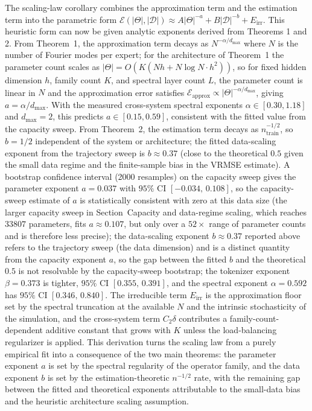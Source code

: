 \documentclass[preprint,12pt]{elsarticle}
\begin{document}
The scaling-law corollary combines the approximation term and the estimation term into the parametric form $\mathcal{E}(|\Theta|,|\mathcal{D}|)\approx A|\Theta|^{-a}+B|\mathcal{D}|^{-b}+E_{\mathrm{irr}}$. This heuristic form can now be given analytic exponents derived from Theorems 1 and 2. From Theorem~1, the approximation term decays as $N^{-\alpha/d_{\max}}$ where $N$ is the number of Fourier modes per expert; for the architecture of Theorem~1 the parameter count scales as $|\Theta|=O(K(Nh+N\log N\cdot h^2))$, so for fixed hidden dimension $h$, family count $K$, and spectral layer count $L$, the parameter count is linear in $N$ and the approximation error satisfies $\mathcal{E}_{\mathrm{approx}}\propto |\Theta|^{-\alpha/d_{\max}}$, giving $a=\alpha/d_{\max}$. With the measured cross-system spectral exponents $\alpha\in[0.30,1.18]$ and $d_{\max}=2$, this predicts $a\in[0.15,0.59]$, consistent with the fitted value from the capacity sweep. From Theorem~2, the estimation term decays as $n_{\mathrm{train}}^{-1/2}$, so $b=1/2$ independent of the system or architecture; the fitted data-scaling exponent from the trajectory sweep is $b\approx0.37$ (close to the theoretical $0.5$ given the small data regime and the finite-sample bias in the VRMSE estimate). A bootstrap confidence interval (2000 resamples) on the capacity sweep gives the parameter exponent $a=0.037$ with $95\%$ CI $[-0.034,\,0.108]$, so the capacity-sweep estimate of $a$ is statistically consistent with zero at this data size (the larger capacity sweep in Section~Capacity and data-regime scaling, which reaches $33807$ parameters, fits $a\approx0.107$, but only over a $52\times$ range of parameter counts and is therefore less precise); the data-scaling exponent $b\approx0.37$ reported above refers to the trajectory sweep (the data dimension) and is a distinct quantity from the capacity exponent $a$, so the gap between the fitted $b$ and the theoretical $0.5$ is not resolvable by the capacity-sweep bootstrap; the tokenizer exponent $\beta=0.373$ is tighter, $95\%$ CI $[0.355,\,0.391]$, and the spectral exponent $\alpha=0.592$ has $95\%$ CI $[0.346,\,0.840]$. The irreducible term $E_{\mathrm{irr}}$ is the approximation floor set by the spectral truncation at the available $N$ and the intrinsic stochasticity of the simulation, and the cross-system term $C_2\delta$ contributes a family-count-dependent additive constant that grows with $K$ unless the load-balancing regularizer is applied. This derivation turns the scaling law from a purely empirical fit into a consequence of the two main theorems: the parameter exponent $a$ is set by the spectral regularity of the operator family, and the data exponent $b$ is set by the estimation-theoretic $n^{-1/2}$ rate, with the remaining gap between the fitted and theoretical exponents attributable to the small-data bias and the heuristic architecture scaling assumption.
\end{document}
